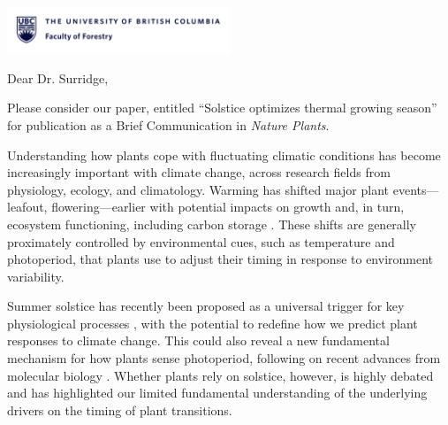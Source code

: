 \documentclass[11pt,a4paper]{article}
\begin{document}

\noindent \includegraphics[width=0.5\textwidth, right]{forestry_letterhead.png}

\noindent Dear Dr. Surridge, %

\vspace{0.25cm} %

\noindent Please consider our paper, entitled ``Solstice optimizes thermal growing season'' for publication as a Brief Communication in \emph{Nature Plants}. 

\vspace{0.25cm}

\noindent Understanding how plants cope with fluctuating climatic conditions has become increasingly important with climate change, across research fields from physiology, ecology, and climatology. Warming has shifted major plant events---leafout, flowering---earlier \supercite{Menzel2006, Fu2019} with potential impacts on growth and, in turn, ecosystem functioning, including carbon storage \supercite{Keenan2014}. These shifts are generally proximately controlled by environmental cues, such as temperature and photoperiod, that plants use to adjust their timing in response to environment variability.

\vspace{0.25cm}
\noindent Summer solstice has recently been proposed as a universal trigger for key physiological processes \supercite{Zohner2023, Journe2024}, with the potential to redefine how we predict plant responses to climate change. This could also reveal a new fundamental mechanism for how plants sense photoperiod, following on recent advances from molecular biology \supercite{wang2024plants}. Whether plants rely on solstice, however, is highly debated and has highlighted our limited fundamental understanding of the underlying drivers on the timing of plant transitions. 

\vspace{0.25cm}
\end{document}
